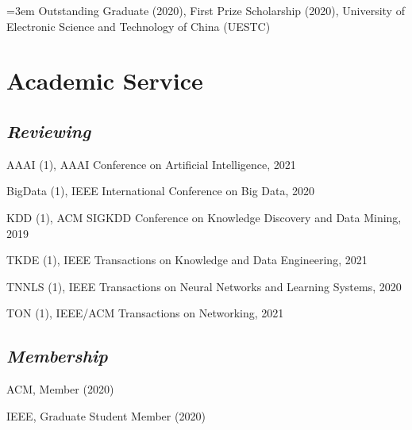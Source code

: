 \documentclass{article}
\begin{document}
\hangindent=3em Outstanding Graduate (2020), First Prize Scholarship (2020), University of Electronic Science and Technology of China (UESTC)

\vspace{-8pt}
\section*{Academic Service}
\vspace{-4pt}


\subsection*{\textnormal{\textit{Reviewing}}}
\vspace{-4pt}
\indent


AAAI (1), AAAI Conference on Artificial Intelligence, 2021

BigData (1), IEEE International Conference on Big Data, 2020

KDD (1), ACM SIGKDD Conference on Knowledge Discovery and Data Mining, 2019

TKDE (1), IEEE Transactions on Knowledge and Data Engineering, 2021

TNNLS (1), IEEE Transactions on Neural Networks and Learning Systems, 2020

TON (1), IEEE/ACM Transactions on Networking, 2021

\subsection*{\textnormal{\textit{Membership}}}
\vspace{-4pt}
\indent 

ACM, Member (2020)

IEEE, Graduate Student Member (2020)



\end{document}
